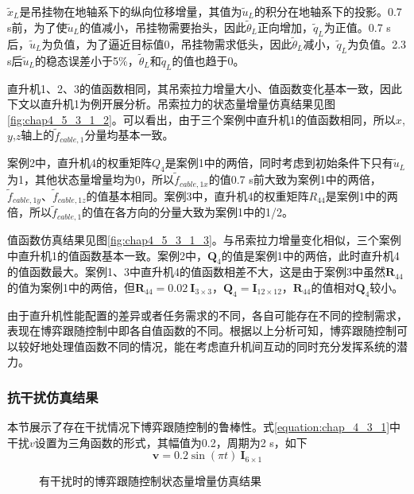 $\tilde{x}_L$是吊挂物在地轴系下的纵向位移增量，其值为$\tilde{u}_L$的积分在地轴系下的投影。0.7 s前，为了使$\tilde{u}_L$的值减小，吊挂物需要抬头，因此$\tilde{\theta}_L$正向增加，$\tilde{q}_L$为正值。0.7 s后，$\tilde{u}_L$为负值，为了逼近目标值0，吊挂物需求低头，因此$\tilde{\theta}_L$减小，$\tilde{q}_L$为负值。2.3 s后$\tilde{u}_L$的稳态误差小于5\%，$\tilde{\theta}_L$和$\tilde{q}_L$的值也趋于0。

直升机1、2、3的值函数相同，其吊索拉力增量大小、值函数变化基本一致，因此下文以直升机1为例开展分析。吊索拉力的状态量增量仿真结果见图\ref{fig:chap4_5_3_1_2}。可以看出，由于三个案例中直升机1的值函数相同，所以$x$,$y$,$z$轴上的$\tilde{f}_{cable,1}$分量均基本一致。

案例2中，直升机4的权重矩阵$Q_4$是案例1中的两倍，同时考虑到初始条件下只有$\tilde{u}_L$为1，其他状态量增量均为0，所以$\tilde{f}_{cable,1x}$的值0.7 s前大致为案例1中的两倍，$\tilde{f}_{cable,1y}$、$\tilde{f}_{cable,1z}$的值基本相同。案例3中，直升机4的权重矩阵$R_{44}$是案例1中的两倍，所以$\tilde{f}_{cable,1}$的值在各方向的分量大致为案例1中的1/2。

值函数仿真结果见图\ref{fig:chap4_5_3_1_3}。与吊索拉力增量变化相似，三个案例中直升机1的值函数基本一致。案例2中，$\mathbf{Q}_4$的值是案例1中的两倍，此时直升机4的值函数最大。案例1、3中直升机4的值函数相差不大，这是由于案例3中虽然$\mathbf{R}_{44}$的值为案例1中的两倍，但$\mathbf{R}_{44} = 0.02\ \mathbf{I}_{3\times3}$，$\mathbf{Q}_4=\mathbf{I}_{12\times12}$，$\mathbf{R}_{44}$的值相对$\mathbf{Q}_4$较小。

由于直升机性能配置的差异或者任务需求的不同，各自可能存在不同的控制需求，表现在博弈跟随控制中即各自值函数的不同。根据以上分析可知，博弈跟随控制可以较好地处理值函数不同的情况，能在考虑直升机间互动的同时充分发挥系统的潜力。
\subsubsection{抗干扰仿真结果}

本节展示了存在干扰情况下博弈跟随控制的鲁棒性。式\ref{equation:chap_4_3_1}中干扰$v$设置为三角函数的形式，其幅值为0.2，周期为2 s，如下
\begin{equation}
  \mathbf{v} = 0.2\sin(\pi t)\ \mathbf{I}_{6\times1}
  \label{equation:4_4_3_2_1}
\end{equation}

\begin{figure}[!htb]
  \caption{有干扰时的博弈跟随控制状态量增量仿真结果}
  \label{fig:chap4_5_3_2_1}
\end{figure}

